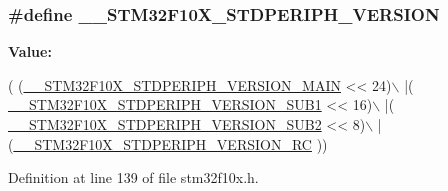 \subsubsection[{\texorpdfstring{\+\_\+\+\_\+\+S\+T\+M32\+F10\+X\+\_\+\+S\+T\+D\+P\+E\+R\+I\+P\+H\+\_\+\+V\+E\+R\+S\+I\+ON}{__STM32F10X_STDPERIPH_VERSION}}]{\setlength{\rightskip}{0pt plus 5cm}\#define \+\_\+\+\_\+\+S\+T\+M32\+F10\+X\+\_\+\+S\+T\+D\+P\+E\+R\+I\+P\+H\+\_\+\+V\+E\+R\+S\+I\+ON}\hypertarget{group___library__configuration__section_gafb19c8675ea01accc2f8e5f467827328}{}\label{group___library__configuration__section_gafb19c8675ea01accc2f8e5f467827328}
{\bfseries Value\+:}
\begin{DoxyCode}
( (\hyperlink{group___library__configuration__section_ga4c236abf68876febcb304f05ed3bafac}{\_\_STM32F10X\_STDPERIPH\_VERSION\_MAIN} << 24)\(\backslash\)
                                             |(
      \hyperlink{group___library__configuration__section_ga7ce69a7c755b9d0551e9755d28612cb0}{\_\_STM32F10X\_STDPERIPH\_VERSION\_SUB1} << 16)\(\backslash\)
                                             |(
      \hyperlink{group___library__configuration__section_ga3ec41777ab08436b801c9c295248a6c7}{\_\_STM32F10X\_STDPERIPH\_VERSION\_SUB2} << 8)\(\backslash\)
                                             |(\hyperlink{group___library__configuration__section_gae0abedef178fde6294fdfd3401ef6e2c}{\_\_STM32F10X\_STDPERIPH\_VERSION\_RC}
      ))
\end{DoxyCode}


Definition at line 139 of file stm32f10x.\+h.


